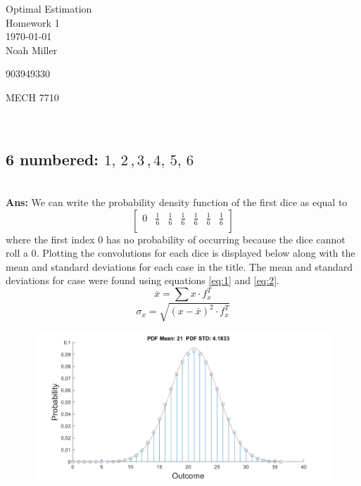 \documentclass[12pt,letterpaper, onecolumn]{exam}
\begin{document}
\begingroup
\centering
\LARGE Optimal Estimation\\
\LARGE Homework 1 \\[0.5em]
\large \today\\[0.5em]
\large Noah Miller\par
\large 903949330\par
\large MECH 7710\par
\endgroup
\pointsdroppedatright   %
\printanswers
\renewcommand{\solution}{\noindent\textbf{Ans:}\enspace}   %

\begin{questions}
    \\
    \begin{parts}
        \part{6 numbered: $1,\,2\,,3\,,4,\,5,\,6$}\\
		        \solution
		        We can write the probability density function of the first dice as equal to
		        \[\begin{bmatrix}
		                0 & \frac{1}{6} & \frac{1}{6} & \frac{1}{6} & \frac{1}{6} & \frac{1}{6} & \frac{1}{6} \\
		            \end{bmatrix} \]
		        where the first index $0$ has no probability of occurring because the dice cannot roll a 0. Plotting the convolutions for each dice is displayed below along with the mean and standard deviations for each case in the title. The mean and standard deviations for case were found using equations \ref{eq:1} and \ref{eq:2}.
		        \begin{equation}\label{eq:1}
		            \overline{x} = \sum x \cdot f_x^T
		        \end{equation}
		        \begin{equation}\label{eq:2}
		            \sigma_x = \sqrt{(x - \overline{x})^2 \cdot f_x^T}
		        \end{equation}
		        \begin{figure}[!h]
		            \centering
		            \includegraphics[width=.91\linewidth]{Q1_a.png}
		        \end{figure}
		        \clearpage

\end{parts}
\end{questions}
\end{document}
